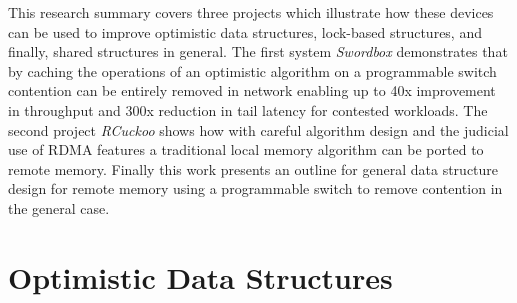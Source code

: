 This research summary covers three projects which illustrate
how these devices can be used to improve optimistic data
structures, lock-based structures, and finally, shared
structures in general.  The first system \textit{Swordbox}
demonstrates that by caching the operations of an optimistic
algorithm on a programmable switch contention can be
entirely removed in network enabling up to 40x improvement
in throughput and 300x reduction in tail latency for
contested workloads. The second project \textit{RCuckoo}
shows how with careful algorithm design and the judicial use
of RDMA features a traditional local memory algorithm can be
ported to remote memory. Finally this work presents an
outline for general data structure design for remote memory
using a programmable switch to remove contention in the
general case.


\section{Optimistic Data Structures}
